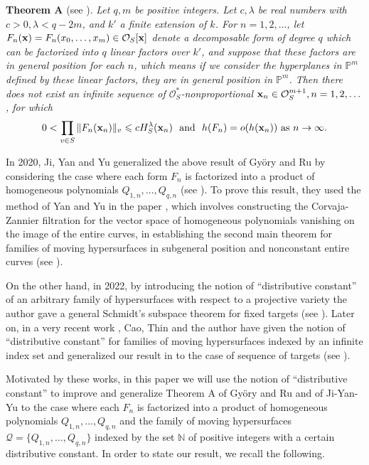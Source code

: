 \documentclass[12pt,leqno]{amsart}
\numberwithin{equation}{section}
\begin{document}
\vskip0.2cm
\noindent
{\bf Theorem A} (see \cite[Theorem 2]{GR}). {\it Let $q, m$ be positive integers. Let $c, \lambda$ be real numbers with $c>0, \lambda<q-2 m$, and  $k'$ a finite extension of $k$. For $n=1,2, \ldots$, let $F_{n}({\bf x})=F_{n}(x_{0}, \ldots, x_{m}) \in \mathcal{O}_{S}[{\bf x}]$ denote a decomposable form of degree $q$ which can be factorized into $q$ linear factors over $k'$, and suppose that these factors are in general position for each $n$, which means if we consider the hyperplanes in $\mathbb{P}^{m}$ defined by these linear factors, they are in general position in $\mathbb{P}^{m}$. Then there does not exist an infinite sequence of $\mathcal{O}_{S}^{*}$-nonproportional ${\bf x}_{n} \in \mathcal{O}_{S}^{m+1}, n=1,2, \ldots$, for which
\begin{align*}
0<\prod_{v \in S}\|F_{n}({\bf x}_{n})\|_{v} \leqslant c H_{S}^{\lambda}({\bf x}_{n})\ 
\text{ and }\ h(F_{n})=o(h({\bf x}_{n})) \text { as } n\rightarrow \infty. 
\end{align*}}

In 2020, Ji, Yan and Yu generalized the above result of Gy\"{o}ry and Ru by considering the case where each form $F_n$ is factorized into a product of homogeneous polynomials $Q_{1,n},\ldots,Q_{q,n}$ (see \cite[Theorem 1.2] {JYY}). To prove this result, they used the method of Yan and Yu in the paper \cite{YY}, which involves constructing the Corvaja-Zannier filtration for the vector space of homogeneous polynomials vanishing on the image of the entire curves, in establishing the second main theorem for families of moving hypersurfaces in subgeneral position and nonconstant entire curves (see \cite[Main Theorem]{YY}).

On the other hand, in 2022, by introducing the notion of ``distributive constant'' of an arbitrary family of hypersurfaces with respect to a projective variety the author gave a general Schmidt's subspace theorem for fixed targets (see \cite[Theorem 1.5]{Qpcf}). Later on, in a very recent work \cite{CQT}, Cao, Thin and the author have given the notion of ``distributive constant'' for families of moving hypersurfaces indexed by an infinite index set and generalized our result in \cite{Qpcf} to the case of sequence of targets (see \cite[Theorem 1.6]{CQT}). 

Motivated by these works, in this paper we will use the notion of ``distributive constant'' to improve and generalize Theorem A of  Gy\"{o}ry and Ru and \cite[Theorem 1.2] {JYY} of Ji-Yan-Yu to the case where each $F_n$ is factorized into a product of homogeneous polynomials $Q_{1,n},\ldots,Q_{q,n}$ and the family of  moving hypersurfaces $\mathcal Q=\{Q_{1,n},\ldots,Q_{q,n}\}$ indexed by the set $\mathbb N$ of positive integers with a certain distributive constant. In order to state our result, we recall the following.
\end{document}
